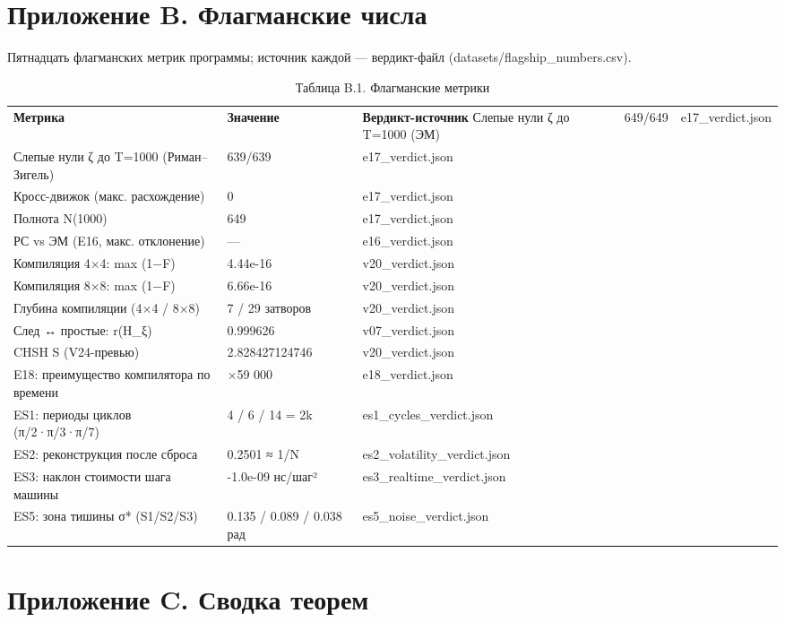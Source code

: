 \documentclass[11pt,a4paper]{article}
\begin{document}
\section{Приложение B. Флагманские числа}

Пятнадцать флагманских метрик программы; источник каждой — вердикт-файл (datasets/flagship\_numbers.csv).

\begin{table}[htbp]\centering\small
\caption{Таблица B.1. Флагманские метрики}
\begin{tabular}{p{} p{} p{}}
\toprule
\textbf{Метрика} & \textbf{Значение} & \textbf{Вердикт-источник}
\midrule
Слепые нули ζ до T=1000 (ЭМ) & 649/649 & e17\_verdict.json \\
Слепые нули ζ до T=1000 (Риман–Зигель) & 639/639 & e17\_verdict.json \\
Кросс-движок (макс. расхождение) & 0 & e17\_verdict.json \\
Полнота N(1000) & 649 & e17\_verdict.json \\
РС vs ЭМ (E16, макс. отклонение) & — & e16\_verdict.json \\
Компиляция 4×4: max (1−F) & 4.44e-16 & v20\_verdict.json \\
Компиляция 8×8: max (1−F) & 6.66e-16 & v20\_verdict.json \\
Глубина компиляции (4×4 / 8×8) & 7 / 29 затворов & v20\_verdict.json \\
След ↔ простые: r(H\_ξ) & 0.999626 & v07\_verdict.json \\
CHSH S (V24-превью) & 2.828427124746 & v20\_verdict.json \\
E18: преимущество компилятора по времени & ×59 000 & e18\_verdict.json \\
ES1: периоды циклов (π/2·π/3·π/7) & 4 / 6 / 14 = 2k & es1\_cycles\_verdict.json \\
ES2: реконструкция после сброса & 0.2501 ≈ 1/N & es2\_volatility\_verdict.json \\
ES3: наклон стоимости шага машины & -1.0e-09 нс/шаг² & es3\_realtime\_verdict.json \\
ES5: зона тишины σ* (S1/S2/S3) & 0.135 / 0.089 / 0.038 рад & es5\_noise\_verdict.json \\
\bottomrule
\end{tabular}
\end{table}

\section{Приложение C. Сводка теорем}
\end{document}
